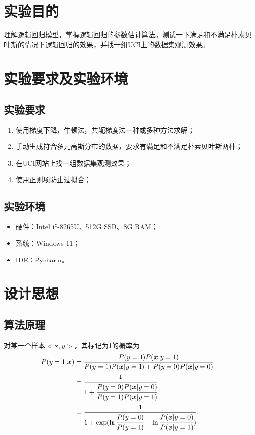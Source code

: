 \documentclass[withoutpreface,bwprint]{cumcmthesis}
\begin{document}
\section{实验目的}
理解逻辑回归模型，掌握逻辑回归的参数估计算法。测试一下满足和不满足朴素贝叶斯的情况下逻辑回归的效果，并找一组UCI上的数据集观测效果。

\section{实验要求及实验环境}
\subsection{实验要求}
\begin{enumerate}
\setlength{\itemindent}{1.5em}
\item 使用梯度下降，牛顿法，共轭梯度法一种或多种方法求解；
\item 手动生成符合多元高斯分布的数据，要求有满足和不满足朴素贝叶斯两种；
\item 在UCI网站上找一组数据集观测效果；
\item 使用正则项防止过拟合；
\end{enumerate}

\subsection{实验环境}
\begin{itemize}
\setlength{\itemindent}{1.5em}
\item 硬件：Intel i5-8265U、512G SSD、8G RAM；
\item 系统：Windows 11；
\item IDE：Pycharm。
\end{itemize}

\section{设计思想}
\subsection{算法原理}
对某一个样本$<\boldsymbol{x},y>$，其标记为1的概率为
\begin{equation*}
\begin{aligned}
P(y=1|\boldsymbol{x})&=\frac{P(y=1)P(\boldsymbol{x}|y=1)}{P(y=1)P(\boldsymbol{x}|y=1)+P(y=0)P(\boldsymbol{x}|y=0)}\\
&=\cfrac{1}{1+\cfrac{P(y=0)P(\boldsymbol{x}|y=0)}{P(y=1)P(\boldsymbol{x}|y=1)}} \\
&=\cfrac{1}{1+\exp(\ln\cfrac{P(y=0)}{P(y=1)}+\ln\cfrac{P(\boldsymbol{x}|y=0)}{P(\boldsymbol{x}|y=1)})}.
\end{aligned}
\end{equation*}
\end{document}
